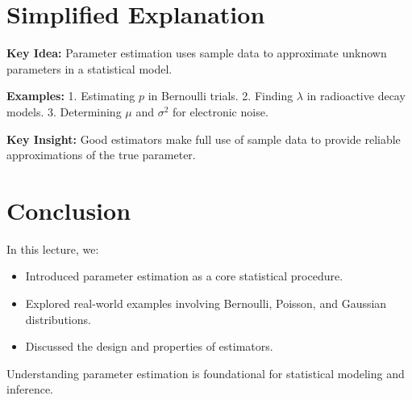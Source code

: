 \documentclass{article}
\begin{document}
\section*{Simplified Explanation}

\textbf{Key Idea:}
Parameter estimation uses sample data to approximate unknown parameters in a statistical model.

\textbf{Examples:}
1. Estimating $p$ in Bernoulli trials.
2. Finding $\lambda$ in radioactive decay models.
3. Determining $\mu$ and $\sigma^2$ for electronic noise.

\textbf{Key Insight:}
Good estimators make full use of sample data to provide reliable approximations of the true parameter.

\section*{Conclusion}

In this lecture, we:
\begin{itemize}
  \item Introduced parameter estimation as a core statistical procedure.
  \item Explored real-world examples involving Bernoulli, Poisson, and Gaussian distributions.
  \item Discussed the design and properties of estimators.
\end{itemize}

Understanding parameter estimation is foundational for statistical modeling and inference.
\end{document}
